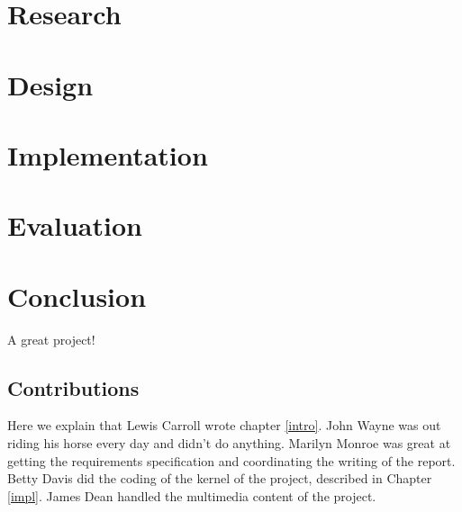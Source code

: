 \documentclass{l3proj}
\begin{document}
\chapter{Research}
\label{research}




\chapter{Design}
\label{design}



\chapter{Implementation}
\label{implementation}



\chapter{Evaluation}
\label{evaluation}


\chapter{Conclusion}
\label{conclusion}



A great project!

\section{Contributions}
\label{contributions}

Here we explain that Lewis Carroll wrote chapter \ref{intro}. John Wayne
was out riding his horse every day and didn't do anything. Marilyn Monroe
was great at getting the requirements specification and coordinating the
writing of the report. Betty Davis did the coding of the kernel of the
project, described in Chapter \ref{impl}.  James Dean handled the
multimedia content of the project.



\end{document}
